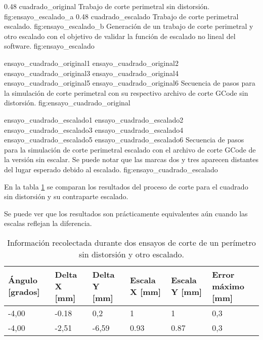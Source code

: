    \subfigab
   {0.48} {cuadrado_original} {Trabajo de corte perimetral sin distorsión.} {fig:ensayo_escalado_a}
   {0.48} {cuadrado_escalado} {Trabajo de corte perimetral escalado.} {fig:ensayo_escalado_b}
   {Generación de un trabajo de corte perimetral y otro escalado con el objetivo de validar la función de escalado no lineal del software. }
   {fig:ensayo_escalado}

   \subfigthreethree
      {ensayo_cuadrado_original1}
      {ensayo_cuadrado_original2}
      {ensayo_cuadrado_original3}
      {ensayo_cuadrado_original4}
      {ensayo_cuadrado_original5}
      {ensayo_cuadrado_original6}
      {Secuencia de pasos para la simulación de corte perimetral con su respectivo archivo de corte GCode sin distorsión.}
      {fig:ensayo_cuadrado_original}


   \subfigthreethree
      {ensayo_cuadrado_escalado1}
      {ensayo_cuadrado_escalado2}
      {ensayo_cuadrado_escalado3}
      {ensayo_cuadrado_escalado4}
      {ensayo_cuadrado_escalado5}
      {ensayo_cuadrado_escalado6}
      {Secuencia de pasos para la simulación de corte perimetral escalado con el archivo de corte GCode de la versión sin escalar. Se puede notar que las marcas dos y tres aparecen distantes del lugar esperado debido al escalado.}
      {fig:ensayo_cuadrado_escalado}


      En la tabla \ref{tbl:ensayo_escalado} se comparan los resultados del proceso de corte para el cuadrado sin distorsión y su contraparte escalado.\par
      Se puede ver que los resultados son prácticamente equivalentes aún cuando las escalas reflejan la diferencia.

      \begin{table}[!ht]
         \centering
         \caption[Ensayos de corte simulado escalado]{Información recolectada durante dos ensayos de corte de un perímetro sin distorsión y otro escalado.}
         \begin{tabular}[!ht]{m{1.6cm}m{1.6cm}m{1.6cm}m{1.6cm}m{1.6cm}m{1.6cm}}
            \toprule
            \textbf{Ángulo [grados]} & \textbf{Delta X [mm]} & \textbf{Delta Y [mm]} & \textbf{Escala X [mm]} & \textbf{Escala Y [mm]} & \textbf{Error máximo [mm]}\\
            \midrule
            {-4,00}& {-0.18}& {0,2}   & {1}    & {1}    & {0,3}\\
            {-4,00}& {-2,51}& {-6,59} & {0.93} & {0.87} & {0,3}\\
            \bottomrule
         \end{tabular}
         \label{tbl:ensayo_escalado}
      \end{table}

